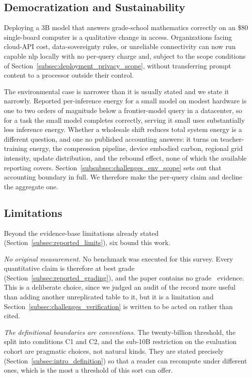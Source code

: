 \subsection{Democratization and Sustainability}
\label{subsec:discussion_implications}

Deploying a 3B model that answers grade-school mathematics correctly on an
\$80 single-board computer is a qualitative change in access. Organizations facing
cloud-API cost, data-sovereignty rules, or unreliable connectivity can now run
capable \gls{nlp} locally with no per-query charge and, subject to the scope
conditions of Section~\ref{subsec:deployment_privacy_scope}, without transferring
prompt content to a processor outside their control.

The environmental case is narrower than it is usually stated and we state it
narrowly. Reported per-inference energy for a small model on modest hardware is
one to two orders of magnitude below a frontier-model query in a datacenter, so
for a task the small model completes correctly, serving it small uses
substantially less inference energy. Whether a wholesale shift reduces total
system energy is a different question, and one no published accounting answers:
it turns on teacher-training energy, the compression pipeline, device embodied
carbon, regional grid intensity, update distribution, and the rebound effect, none
of which the available reporting covers.
Section~\ref{subsubsec:challenges_env_scope} sets out that accounting boundary in
full. We therefore make the per-query claim and decline the aggregate one.

\subsection{Limitations}
\label{subsec:discussion_limitations}

Beyond the evidence-base limitations already stated
(Section~\ref{subsec:reported_limits}), six bound this work.

\emph{No original measurement.} No benchmark was executed for this survey. Every
quantitative claim is therefore at best grade~\evB{}
(Section~\ref{subsec:reported_grading}), and the paper contains no grade~\evA{}
evidence. This is a deliberate choice, since we judged an audit of the record more
useful than adding another unreplicated table to it, but it is a limitation and
Section~\ref{subsec:challenges_verification} is written to be acted on rather than
cited.

\emph{The definitional boundaries are conventions.} The twenty-billion threshold,
the split into conditions C1 and C2, and the sub-10B restriction on the evaluation
cohort are pragmatic choices, not natural kinds. They are stated precisely
(Section~\ref{subsec:intro_definition}) so that a reader can recompute under
different ones, which is the most a threshold of this sort can offer.

